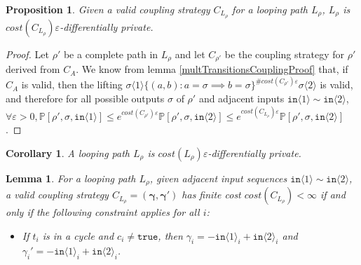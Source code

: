 \documentclass[12pt]{article}
\newcommand{\PP}{\mathbb{P}}
\newcommand{\brangle}[1]{\langle #1 \rangle}
\newtheorem{lemma}[thm]{Lemma}
\newtheorem{prop}[thm]{Proposition}
\newtheorem{cor}[thm]{Corollary}
\theoremstyle{definition}
\begin{document}
\begin{prop}
    Given a valid coupling strategy $C_{L_\rho}$ for a looping path $L_\rho$, $L_\rho$ is $cost(C_{L_\rho})\varepsilon$-differentially private. 
\end{prop}
\begin{proof}
    Let $\rho'$ be a complete path in $L_\rho$ and let $C_{\rho'}$ be the coupling strategy for $\rho'$ derived from $C_A$. We know from lemma \ref{multTransitionsCouplingProof} that, if $C_A$ is valid, then the lifting $\sigma\brangle{1}\{(a, b): a=\sigma\implies b=\sigma\}^{\#cost(C_{\rho'})\varepsilon}\sigma\brangle{2}$ is valid, 
    and therefore for all possible outputs $\sigma$ of $\rho'$ and adjacent inputs $\texttt{in}\brangle{1}\sim\texttt{in}\brangle{2}$, $\forall \varepsilon>0, \PP[\rho', \sigma, \texttt{in}\brangle{1}]\leq e^{cost(C_{\rho'})\varepsilon}\PP[\rho', \sigma, \texttt{in}\brangle{2}]\leq e^{cost(C_{L_\rho})\varepsilon}\PP[\rho', \sigma, \texttt{in}\brangle{2}]$.
\end{proof}
\begin{cor}
    A looping path $L_\rho$ is $cost(L_\rho)\varepsilon$-differentially private. 
\end{cor}



\begin{lemma}\label{finiteCostConstraintLemma}
    For a looping path $L_\rho$, given adjacent input sequences $\texttt{in}\brangle{1}\sim \texttt{in}\brangle{2}$, a valid coupling strategy $C_{L_\rho} = (\mathbf{\gamma}, \mathbf{\gamma}')$ has finite cost $cost(C_{L_\rho})<\infty$ if and only if the following constraint applies for all $i$:
    \begin{itemize}
        \item If $t_i$ is in a cycle and $c_i\neq\texttt{true}$, then $\gamma_i = -\texttt{in}\brangle{1}_i+\texttt{in}\brangle{2}_i$ and $\gamma_i' = -\texttt{in}\brangle{1}_i+\texttt{in}\brangle{2}_i$.
    \end{itemize}
\end{lemma}
\end{document}
